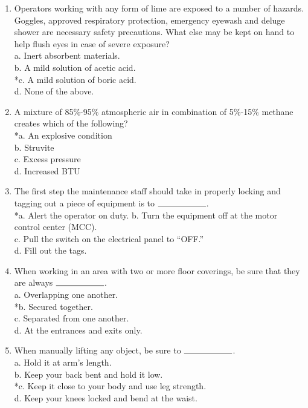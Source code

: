 \begin{enumerate}
\item Operators working with any form of lime are exposed to a number of hazards. Goggles, approved respiratory protection, emergency eyewash and deluge shower are necessary safety precautions. What else may be kept on hand to help flush eyes in case of severe exposure?\\
a.  Inert absorbent materials.\\
b.  A mild solution of acetic acid.\\
*c. A mild solution of boric acid.\\
d.  None of the above.

\item A mixture of 85\%-95\% atmospheric air in combination of 5\%-15\% methane creates which of the following?\\
*a. An explosive condition\\
b. Struvite\\
c. Excess pressure\\
d. Increased BTU

\item The first step the maintenance staff should take in properly locking and tagging out a piece of equipment is to $\rule{2cm}{0.15mm}$.\\
*a. Alert the operator on duty.
b.  Turn the equipment off at the motor control center (MCC).\\
c.  Pull the switch on the electrical panel to “OFF.”\\
d.  Fill out the tags.\\


\item When working in an area with two or more floor coverings, be sure that they are always $\rule{2cm}{0.15mm}$.\\
a.  Overlapping one another.\\
*b. Secured together.\\
c.  Separated from one another.\\
d.  At the entrances and exits only.

\item When manually lifting any object, be sure to $\rule{2cm}{0.15mm}$.\\
a.  Hold it at arm’s length.\\
b.  Keep your back bent and hold it low.\\
*c. Keep it close to your body and use leg strength.\\
d.  Keep your knees locked and bend at the waist.



\end{enumerate}
